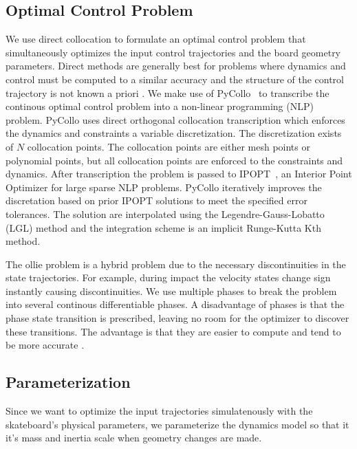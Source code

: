 \documentclass[default,iicol]{sn-jnl}
\begin{document}
\subsection{Optimal Control Problem}
We use direct collocation to formulate an optimal control problem that
simultaneously optimizes the input control trajectories and the board geometry
parameters.
Direct methods are generally best for problems where dynamics and control must
be computed to a similar accuracy and the structure of the control trajectory
is not known a priori \cite{kelly_introduction_2017}.
We make use of PyCollo~\cite{brockie_predictive_2021} to transcribe the
continous optimal control problem into a non-linear programming (NLP) problem.
PyCollo uses direct orthogonal collocation transcription which enforces the 
dynamics and constraints a variable discretization.
The discretization exists of $N$ collocation points.
The collocation points are either mesh points or polynomial points, but all
collocation points are enforced to the constraints and dynamics.
After transcription the problem is passed to IPOPT~\cite{wachter_implementation_2006}, an Interior
Point Optimizer for large sparse NLP problems.
PyCollo iteratively improves the discretation based on prior IPOPT solutions to
meet the specified error tolerances.
The solution are interpolated using the Legendre-Gauss-Lobatto (LGL) method and
the integration scheme is an implicit Runge-Kutta Kth method.

The ollie problem is a hybrid problem due to the necessary discontinuities in
the state trajectories.
For example, during impact the velocity states change sign instantly causing
discontinuities.
We use multiple phases to break the problem into several continous
differentiable phases.
A disadvantage of phases is that the phase state transition is prescribed,
leaving no room for the optimizer to discover these transitions.  The advantage
is that they are easier to compute and tend to be more accurate
\cite{kelly_introduction_2017}.

\subsection{Parameterization}\label{s_paropt}
Since we want to optimize the input trajectories simulatenously with the
skateboard's physical parameters, we parameterize the dynamics model so that it
it's mass and inertia scale when geometry changes are made.
\end{document}
